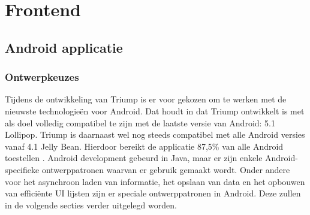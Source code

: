 \section{Frontend}
\subsection{Android applicatie}

\subsubsection{Ontwerpkeuzes}
Tijdens de ontwikkeling van Triump is er voor gekozen om te werken met de nieuwste technologieën voor Android. Dat houdt in dat Triump ontwikkelt is met als doel volledig compatibel te zijn met de laatste versie van Android: 5.1 Lollipop. Triump is daarnaast wel nog steeds compatibel met alle Android versies vanaf 4.1 Jelly Bean. Hierdoor bereikt de applicatie 87,5\% van alle Android toestellen \cite{market_share}. 
Android development gebeurd in Java, maar er zijn enkele Android-specifieke ontwerppatronen waarvan er gebruik gemaakt wordt. Onder andere voor het asynchroon laden van informatie, het opslaan van data en het opbouwen van efficiënte UI lijsten zijn er speciale ontwerppatronen in Android. Deze zullen in de volgende secties verder uitgelegd worden.

